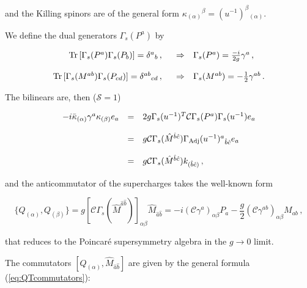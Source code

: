 \documentclass[12pt,a4paper]{article}
\begin{document}
\noindent 
and the Killing spinors are of the general form
$\kappa_{(\alpha)}{}^{\beta}=(u^{-1})^{\beta}{}_{(\alpha)}$.

We define the dual generators $\Gamma_{s}(P^{a})$ by

\begin{equation}
  \begin{array}{rcl}
{\rm Tr}\, [\Gamma_{s}(P^{a})\Gamma_{s}(P_{b})]= \delta^{a}{}_{b}\, , 
\,\,\,\,
 & \Rightarrow & 
\Gamma_{s}(P^{a}) = {\textstyle\frac{-i}{2g}}\gamma^{a}\, , \\
& & \\
{\rm Tr}\, [\Gamma_{s}(M^{ab})\Gamma_{s}(P_{cd})]= \delta^{ab}{}_{cd}\, , 
\,\,\,\,
 & \Rightarrow & 
\Gamma_{s}(M^{ab}) = -{\textstyle\frac{1}{2}}\gamma^{ab}\, .\\
\end{array}
\end{equation}

The bilinears are, then ($\mathcal{S}=1$)

\begin{equation}
  \begin{array}{rcl}
-i\bar{\kappa}_{(\alpha)}\gamma^{a}\kappa_{(\beta)} e_{a}
 & =  & 
2g\Gamma_{s}(u^{-1})^{T}\mathcal{C} \Gamma_{s}(P^{a})\Gamma_{s}(u^{-1}) e_{a} 
\\ 
& & \\
& = & g\mathcal{C} \Gamma_{s}(\hat{M}^{\hat{b}\hat{c}}) 
\Gamma_{\rm Adj}(u^{-1})^{a}{}_{\hat{b}\hat{c}}
e_{a} 
\\
& & \\
& = & g\mathcal{C} \Gamma_{s}(\hat{M}^{\hat{b}\hat{c}}) 
k_{(\hat{b}\hat{c})}\, ,\\
\end{array}
\end{equation}

\noindent 
and the anticommutator of the supercharges takes the well-known form

\begin{equation}
\{Q_{(\alpha)},Q_{(\beta)}\} = 
g[\mathcal{C} \Gamma_{s}(\hat{M}^{\hat{a}\hat{b}})]_{\alpha\beta}
\hat{M}_{\hat{a}\hat{b}} = -i(\mathcal{C}\gamma^{a})_{\alpha\beta}P_{a}
-{\textstyle\frac{g}{2}}(\mathcal{C}\gamma^{ab})_{\alpha\beta}M_{ab}\, ,
\end{equation}

\noindent
that reduces to the Poincar\'e supersymmetry algebra in the
$g\rightarrow 0 $ limit.

The commutators $[Q_{(\alpha)},\hat{M}_{\hat{a}\hat{b}}]$ are given by
the general formula (\ref{eq:QTcommutators}):
\end{document}
